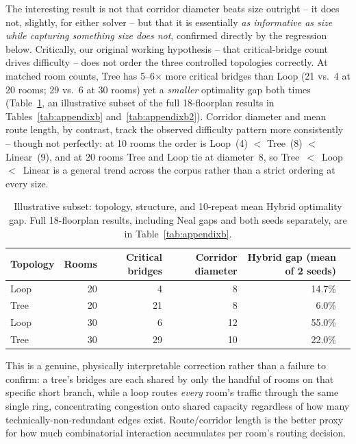 \documentclass[11pt]{article}
\begin{document}
The interesting result is not that corridor diameter beats size outright -- it does not, slightly, for either solver -- but that it is essentially \emph{as informative as size while capturing something size does not}, confirmed directly by the regression below. Critically, our original working hypothesis -- that critical-bridge count drives difficulty -- does not order the three controlled topologies correctly. At matched room counts, Tree has 5--6$\times$ more critical bridges than Loop (21 vs.\ 4 at 20 rooms; 29 vs.\ 6 at 30 rooms) yet a \emph{smaller} optimality gap both times (Table~\ref{tab:synthetic}, an illustrative subset of the full 18-floorplan results in Tables~\ref{tab:appendixb} and~\ref{tab:appendixb2}). Corridor diameter and mean route length, by contrast, track the observed difficulty pattern more consistently -- though not perfectly: at 10 rooms the order is Loop~(4) $<$ Tree~(8) $<$ Linear~(9), and at 20 rooms Tree and Loop tie at diameter~8, so Tree~$<$~Loop~$<$~Linear is a general trend across the corpus rather than a strict ordering at every size.

\begin{table}[h]
\centering
\caption{Illustrative subset: topology, structure, and 10-repeat mean Hybrid optimality gap. Full 18-floorplan results, including Neal gaps and both seeds separately, are in Table~\ref{tab:appendixb}.}
\label{tab:synthetic}
\small
\begin{tabular}{lrrrrr}
\toprule
Topology & Rooms & Critical bridges & Corridor diameter & Hybrid gap (mean of 2 seeds) \\
\midrule
Loop & 20 & 4 & 8 & 14.7\% \\
Tree & 20 & 21 & 8 & 6.0\% \\
Loop & 30 & 6 & 12 & 55.0\% \\
Tree & 30 & 29 & 10 & 22.0\% \\
\bottomrule
\end{tabular}
\end{table}

This is a genuine, physically interpretable correction rather than a failure to confirm: a tree's bridges are each shared by only the handful of rooms on that specific short branch, while a loop routes \emph{every} room's traffic through the same single ring, concentrating congestion onto shared capacity regardless of how many technically-non-redundant edges exist. Route/corridor length is the better proxy for how much combinatorial interaction accumulates per room's routing decision.
\end{document}
